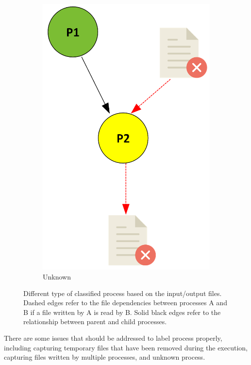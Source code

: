 \documentclass[a4paper,num-refs]{oup-contemporary}
\begin{document}
\begin{figure}
\begin{subfigure}{0.4\linewidth}
    \includegraphics[scale=0.34]{images/yellow.png}
    \caption{Unknown}
    \label{fig:yellow}
\end{subfigure}
    \caption{Different type of classified process based on the input/output files.
  Dashed edges refer to the file dependencies between processes A and B 
  if a file written by A is read by B. Solid black edges refer to the 
  relationship between parent and child processes.}
    \label{fig:processes}
\end{figure}

There are some issues that should be addressed to label process 
properly, including capturing temporary files that have been removed 
during the execution, capturing files written by multiple processes, 
and unknown process.
\end{document}
